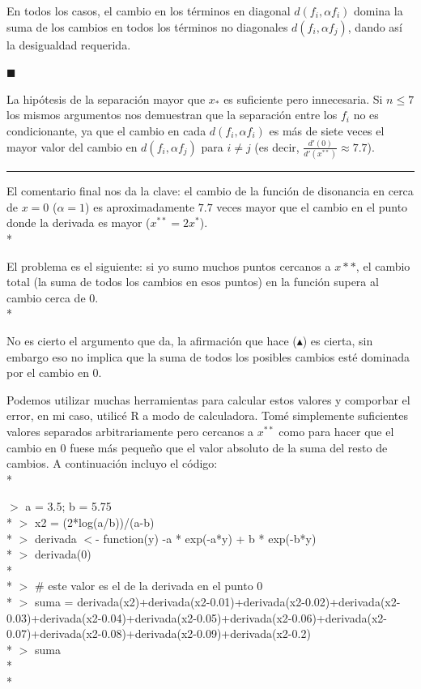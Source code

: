 \documentclass[11pt,a4paper]{article}
\begin{document}
\noindent En todos los casos, el cambio en los términos en diagonal $d(f_i, \alpha f_i)$ domina la suma de los cambios en todos los términos no diagonales $d(f_i, \alpha f_j)$, dando así la desigualdad requerida.

$\blacksquare$

La hipótesis de la separación mayor que $x_{*}$ es suficiente pero innecesaria. Si $n \leq 7$ los mismos argumentos nos demuestran que la separación entre los $f_i$ no es condicionante, ya que el cambio en cada $d(f_i, \alpha f_i)$ es más de siete veces el mayor valor del cambio en $d(f_i, \alpha f_j)$ para $ i \neq j$ (es decir, $\frac{d'(0)}{d'(x^{**})} \approx 7.7$). 

\noindent\rule{2cm}{0.4pt}

El comentario final nos da la clave: el cambio de la función de disonancia en cerca de $x = 0$ ($\alpha = 1$) es aproximadamente $7.7$ veces mayor que el cambio en el punto donde la derivada es mayor ($x^{**} = 2x^{*}$). \\*

El problema es el siguiente: si yo sumo muchos puntos cercanos a $x**$, el cambio total (la suma de todos los cambios en esos puntos) en la función supera al cambio cerca de $0$. \\*

No es cierto el argumento que da, la afirmación que hace ($\blacktriangle$) es cierta, sin embargo eso no implica que la suma de todos los posibles cambios esté dominada por el cambio en $0$. 

Podemos utilizar muchas herramientas para calcular estos valores y comporbar el error, en mi caso, utilicé R a modo de calculadora. Tomé simplemente suficientes valores separados arbitrariamente pero cercanos a $x^{**}$ como para hacer que el cambio en $0$ fuese más pequeño que el valor absoluto de la suma del resto de cambios. A continuación incluyo el código: \\*

\vspace{2cm} 

\noindent $>$ a = 3.5; b = 5.75 \\*
\noindent $>$ x2 = (2*log(a/b))/(a-b) \\*
\noindent $>$ derivada $<$- function(y) { -a * exp(-a*y) + b * exp(-b*y) } \\*
\noindent $>$ derivada(0) \\*
 \\*
\noindent $>$ # este valor es el de la derivada en el punto 0 \\*
\noindent $>$ suma = derivada(x2)+derivada(x2-0.01)+derivada(x2-0.02)+derivada(x2-0.03)+derivada(x2-0.04)+derivada(x2-0.05)+derivada(x2-0.06)+derivada(x2-0.07)+derivada(x2-0.08)+derivada(x2-0.09)+derivada(x2-0.2) \\*
\noindent $>$ suma \\*
 \\*
\end{document}
